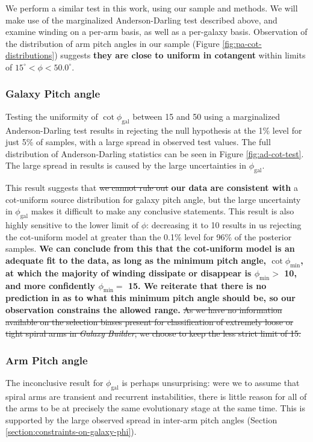We perform a similar test in this work, using our sample and methods. We will make use of the marginalized Anderson-Darling test described above, and examine winding on a per-arm basis, as well as a per-galaxy basis. Observation of the distribution of arm pitch angles in our sample (Figure \ref{fig:pa-cot-distributions}) suggests {\bf they are close to uniform in cotangent} within limits of $15^\circ < \phi < 50.0^\circ$.

\subsubsection{Galaxy Pitch angle}

Testing the uniformity of $\cot\phi_\mathrm{gal}$ between {15\degree} and {50\degree} using a marginalized Anderson-Darling test results in rejecting the null hypothesis at the 1\% level for just 5\% of samples, with a large spread in observed test values. The full distribution of Anderson-Darling statistics can be seen in Figure \ref{fig:ad-cot-test}. The large spread in results is caused by the large uncertainties in $\phi_\mathrm{gal}$.

This result suggests that \sout{we cannot rule out} {\bf our data are consistent with} a cot-uniform source distribution for galaxy pitch angle, but the large uncertainty in $\phi_\mathrm{gal}$ makes it difficult to make any conclusive statements. This result is also highly sensitive to the lower limit of $\phi$: decreasing it to {10\degree} results in us rejecting the cot-uniform model at greater than the 0.1\% level for 96\% of the posterior samples. {\bf We can conclude from this that the \citet{2019arXiv190910291P} cot-uniform model is an adequate fit to the data, as long as the minimum pitch angle, $\cot{\phi_\mathrm{min}}$, at which the majority of winding dissipate or disappear is  $\phi_\mathrm{min} > $ {10\degree}, and more confidently $\phi_\mathrm{min} = $ {15\degree}. We reiterate that there is no prediction in \citet{2019arXiv190910291P} as to what this minimum pitch angle should be, so our observation constrains the allowed range.} \sout{As we have no information available on the selection biases present for classification of extremely loose or tight spiral arms in \textit{Galaxy Builder}, we choose to keep the less strict limit of {15\degree}.}

\subsubsection{Arm Pitch angle}
The inconclusive result for $\phi_\mathrm{gal}$ is perhaps unsurprising: were we to assume that spiral arms are transient and recurrent instabilities, there is little reason for all of the arms to be at precisely the same evolutionary stage at the same time. This is supported by the large observed spread in inter-arm pitch angles (Section \ref{section:constraints-on-galaxy-phi}).

